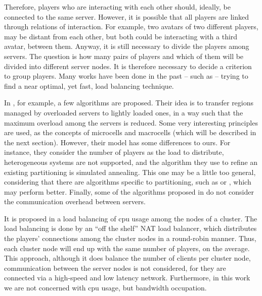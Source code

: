 Therefore, players who are interacting with each other should, ideally, be connected to the same server. However, it is possible that all players are linked through relations of interaction. For example, two avatars of two different players, may be distant from each other, but both could be interacting with a third avatar, between them. Anyway, it is still necessary to divide the players among servers. The question is how many pairs of players and which of them will be divided into different server nodes. It is therefore necessary to decide a criterion to group players. Many works have been done in the past -- such as \cite{devleeschauwer2005dma,lu2006lbm,chen2005lad,duong2003dls,ahmed2008mol} --  trying to find a near optimal, yet fast, load balancing technique.

In \cite{devleeschauwer2005dma}, for example, a few algorithms are proposed. Their idea is to transfer regions managed by overloaded servers to  lightly loaded ones, in a way such that the maximum overload among the servers is reduced. Some very interesting principles are used, as the concepts of microcells and macrocells (which will be described in the next section). However, their model has some differences to ours. For instance, they consider the number of players as the load to distribute, heterogeneous systems are not supported, and the algorithm they use to refine an existing partitioning is simulated annealing. This one may be a little too general, considering that there are algorithms specific to partitioning, such as \cite{kernighan1970ehp} or \cite{fiduccia1982lth}, which may perform better. Finally, some of the algorithms proposed in \cite{devleeschauwer2005dma} do not consider the communication overhead between servers.

It is proposed in \cite{lu2006lbm} a load balancing of cpu usage among the nodes of a cluster. The load balancing is done by an ``off the shelf'' NAT load balancer, which distributes the players' connections among the cluster nodes in a round-robin manner. Thus, each cluster node will end up with the same number of players, on the average. This approach, although it does balance the number of clients per cluster node, communication between the server nodes is not considered, for they are connected via a high-speed and low latency network. Furthermore, in this work we are not concerned with cpu usage, but bandwidth occupation.%

